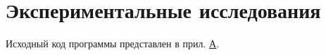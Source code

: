 \section{Экспериментальные исследования}

Исходный код программы представлен в прил. \hyperlink{app-a}{А}.

\clearpage
